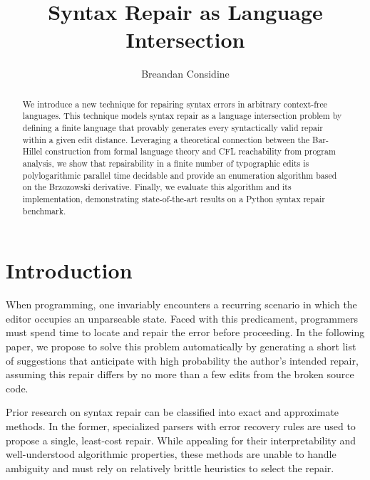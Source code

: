 \documentclass[sigplan,acmsmall,nonacm,screen]{acmart}\settopmatter{printfolios=false,printccs=false,printacmref=false}
\begin{document}
%
\title{Syntax Repair as Language Intersection}
%
\begin{abstract}
We introduce a new technique for repairing syntax errors in arbitrary context-free languages. This technique models syntax repair as a language intersection problem by defining a finite language that provably generates every syntactically valid repair within a given edit distance. Leveraging a theoretical connection between the Bar-Hillel construction from formal language theory and CFL reachability from program analysis, we show that repairability in a finite number of typographic edits is polylogarithmic parallel time decidable and provide an enumeration algorithm based on the Brzozowski derivative. Finally, we evaluate this algorithm and its implementation, demonstrating state-of-the-art results on a Python syntax repair benchmark.
\end{abstract}

\author{Breandan Considine}

\maketitle

\section{Introduction}\label{sec:intro}

When programming, one invariably encounters a recurring scenario in which the editor occupies an unparseable state. Faced with this predicament, programmers must spend time to locate and repair the error before proceeding. In the following paper, we propose to solve this problem automatically by generating a short list of suggestions that anticipate with high probability the author's intended repair, assuming this repair differs by no more than a few edits from the broken source code.

Prior research on syntax repair can be classified into exact and approximate methods. In the former, specialized parsers with error recovery rules are used to propose a single, least-cost repair. While appealing for their interpretability and well-understood algorithmic properties, these methods are unable to handle ambiguity and must rely on relatively brittle heuristics to select the repair.
\end{document}
